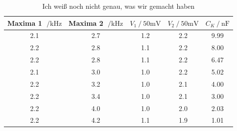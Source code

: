 \begin{table}
  \centering
  \caption{Ich weiß noch nicht genau, was wir gemacht haben} %
  \label{tab:aufgabeC}
  \begin{tabular}{c c c c c}
      \toprule
      {Maxima 1 $\;/ \si{\kilo\hertz}$} & {Maxima 2 $\;/ \si{\kilo\hertz}$} & {$V_1 \:/\: \si{50 \milli\volt}$} & {$V_2 \:/\: \si{50 \milli\volt}$} & {$C_K \:/\: \si{\nano\farad}$} \\
      \midrule
      2.1 & 2.7 & 1.2 & 2.2 & 9.99 \\
      2.2 & 2.8 & 1.1 & 2.2 & 8.00 \\
      2.2 & 2.8 & 1.1 & 2.2 & 6.47 \\
      2.1 & 3.0 & 1.0 & 2.2 & 5.02 \\
      2.2 & 3.2 & 1.0 & 2.1 & 4.00 \\
      2.2 & 3.4 & 1.0 & 2.1 & 3.00 \\
      2.2 & 4.0 & 1.0 & 2.0 & 2.03 \\
      2.2 & 4.2 & 1.1 & 1.9 & 1.01 \\
      \bottomrule
  \end{tabular}
\end{table}



